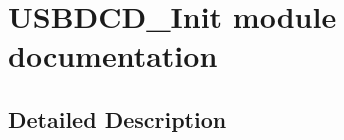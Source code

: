 \hypertarget{group___u_s_b_d_c_d___init__module}{}\section{U\+S\+B\+D\+C\+D\+\_\+\+Init module documentation}
\label{group___u_s_b_d_c_d___init__module}


\subsection{Detailed Description}
